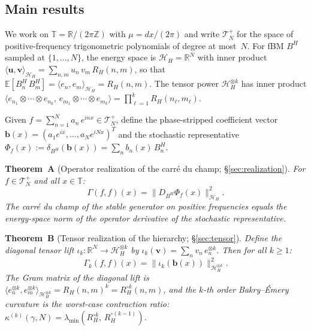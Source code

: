 \documentclass[11pt,a4paper]{article}
\theoremstyle{plain}
\theoremstyle{definition}
\theoremstyle{remark}
\newcommand{\E}{\mathbb{E}}
\newcommand{\R}{\mathbb{R}}
\newcommand{\Z}{\mathbb{Z}}
\newcommand{\T}{\mathbb{T}}
\newcommand{\HH}{\mathcal{H}_H}
\begin{document}
\subsection{Main results}

We work on $\T = \R/(2\pi\Z)$ with $\mu = dx/(2\pi)$
and write $\mathcal{T}_N^+$ for the space of
positive-frequency trigonometric polynomials of degree at
most~$N$.  For fBM $B^H$ sampled at $\{1,\ldots,N\}$,
the energy space is $\HH = \R^N$ with inner product
$\langle \mathbf{u}, \mathbf{v} \rangle_{\HH}
= \sum_{n,m} u_n\,v_m\,R_H(n,m)$, so that
$\E[B_n^H\,B_m^H] = \langle e_n, e_m \rangle_{\HH}
= R_H(n,m)$.
The tensor power $\HH^{\otimes k}$ has inner product
$\langle e_{n_1} \otimes \cdots \otimes e_{n_k},\,
e_{m_1} \otimes \cdots \otimes e_{m_k} \rangle
= \prod_{\ell=1}^k R_H(n_\ell, m_\ell)$.

Given $f = \sum_{n=1}^N a_n\,e^{inx} \in \mathcal{T}_N^+$,
define the phase-stripped coefficient vector
$\mathbf{b}(x) = (a_1 e^{ix}, \ldots, a_N e^{iNx})^T$
and the stochastic representative
$\Phi_f(x) := \delta_{B^H}(\mathbf{b}(x))
= \sum_n b_n(x)\,B_n^H$.

\medskip\noindent
\textbf{Theorem~A} (Operator realization of the carr\'e
du champ; \S\ref{sec:realization}).
\emph{For $f \in \mathcal{T}_N^+$ and all $x \in \T$:
\begin{equation}\label{eq:intro-A}
  \Gamma(f,f)(x)
  = \bigl\|D_{B^H}\Phi_f(x)\bigr\|^2_{\HH}.
\end{equation}
The carr\'e du champ of the stable generator on
positive frequencies equals the energy-space norm of the
operator derivative of the stochastic representative.}

\medskip\noindent
\textbf{Theorem~B} (Tensor realization of the hierarchy;
\S\ref{sec:tensor}).
\emph{Define the diagonal tensor lift
$\iota_k\colon \R^N \to \HH^{\otimes k}$ by
$\iota_k(\mathbf{v})
= \sum_n v_n\,e_n^{\otimes k}$.
Then for all $k \geq 1$:
\begin{equation}\label{eq:intro-B}
  \Gamma_k(f,f)(x)
  = \bigl\|\iota_k(\mathbf{b}(x))\bigr\|^2_{\HH^{\otimes k}}.
\end{equation}
The Gram matrix of the diagonal lift is
$\langle e_n^{\otimes k}, e_m^{\otimes k}\rangle_{\HH^{\otimes k}}
= R_H(n,m)^k = R_H^{\circ k}(n,m)$,
and the $k$-th order Bakry--\'Emery curvature is the
worst-case contraction ratio:
$\kappa^{(k)}(\gamma,N) = \lambda_{\min}(R_H^{\circ k},\,
R_H^{\circ(k-1)})$.}
\end{document}
